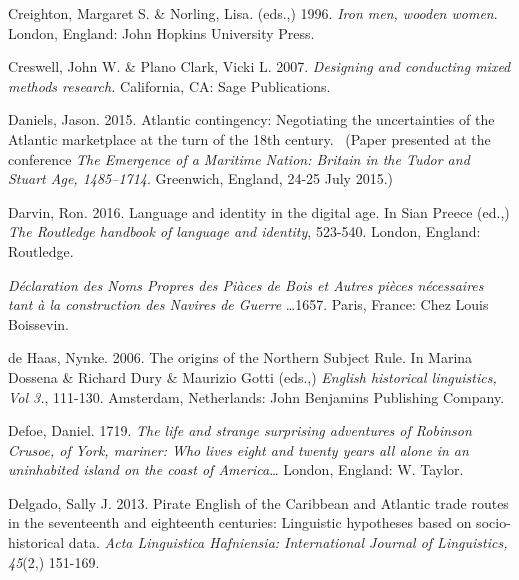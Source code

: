 \begin{styleStandard}
Creighton, Margaret S. \& Norling, Lisa. (eds.,) 1996. \textit{Iron men, wooden women}. London, England: John Hopkins University Press. 
\end{styleStandard}

\begin{styleStandard}
Creswell, John W. \& Plano Clark, Vicki L. 2007. \textit{Designing and conducting mixed methods research.} California, CA: Sage Publications.
\end{styleStandard}

\begin{styleStandard}
Daniels, Jason. 2015. Atlantic contingency: Negotiating the uncertainties of the Atlantic marketplace at the turn of the 18th century. \ (Paper presented at the conference \textit{The Emergence of a Maritime Nation: Britain in the Tudor and Stuart Age, 1485–1714}. Greenwich, England, 24-25 July 2015.)
\end{styleStandard}

\begin{styleStandard}
Darvin, Ron. 2016. Language and identity in the digital age. In Sian Preece (ed.,) \textit{The Routledge handbook of language and identity}, 523-540. London, England: Routledge. 
\end{styleStandard}

\begin{styleStandard}
\textit{Déclaration des Noms Propres des Piàces de Bois et Autres pièces nécessaires tant à la construction des Navires de Guerre }…1657. Paris, France: Chez Louis Boissevin.
\end{styleStandard}

\begin{styleStandard}
de Haas, Nynke. 2006. The origins of the Northern Subject Rule. In Marina Dossena \& Richard Dury \& Maurizio Gotti (eds.,) \textit{English historical linguistics, Vol 3.}, 111-130. Amsterdam, Netherlands: John Benjamins Publishing Company.
\end{styleStandard}

\begin{styleStandard}
Defoe, Daniel. 1719. \textit{The life and strange surprising adventures of Robinson Crusoe, of} \textit{York, mariner: Who lives eight and twenty years all alone in an uninhabited island on the coast of America… }London, England: W. Taylor. 
\end{styleStandard}

\begin{styleStandard}
Delgado, Sally J. 2013. Pirate English of the Caribbean and Atlantic trade routes in the seventeenth and eighteenth centuries: Linguistic hypotheses based on socio-historical data. \textit{Acta Linguistica Hafniensia: International Journal of Linguistics, 45}(2,) 151-169.
\end{styleStandard}

